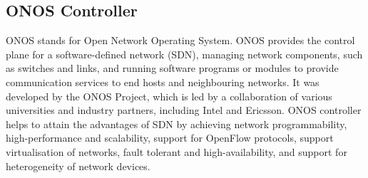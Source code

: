 \documentclass{article}
\begin{document}
\subsection{ONOS Controller}
ONOS stands for Open Network Operating System. ONOS provides the control plane for a software-defined network (SDN), managing network components, such as switches and links, and running software programs or modules to provide communication services to end hosts and neighbouring networks. It was developed by the ONOS Project, which is led by a collaboration of various universities and industry partners, including Intel and Ericsson. ONOS controller helps to attain the advantages of SDN by achieving network programmability, high-performance and scalability, support for OpenFlow protocols, support virtualisation of networks, fault tolerant and high-availability, and support for heterogeneity of network devices.
\end{document}
